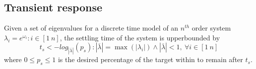 \documentclass[sigconf]{llncs}
\begin{document}
\subsection{Transient response} 
\label{asec:transientspecification}

\begin{theorem}
Given a set of eigenvalues for a discrete time model of an $n^{th}$ order system $\lambda_i =e^{\omega_i}: i \in [1\ n]$, the settling time of the system is upperbounded by
\begin{equation}
t_s<-log_{|\overline{\lambda}|}({p_s}) : |\overline{\lambda}| =\max(|\lambda_i|) \wedge |\overline{\lambda}|<1,\ \forall i \in [1\ n]
\label{eq:set_time}
\end{equation}
where $0\leq p_s \leq 1$ is the desired percentage of the target within to remain after $t_s$.
\end{theorem} 
\end{document}
